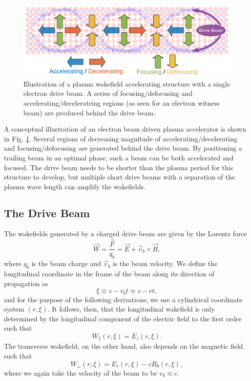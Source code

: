\begin{figure}[hbt]
    \centering
    \includegraphics[width=0.85\linewidth,trim={0mm 0mm 0mm 0mm},clip]{figures/PlasmaWakefield}
    \caption{\label{Fig:PWFA:Illust} Illustration of a plasma wakefield accelerating structure with a single electron drive beam. A series of focusing/defocusing and accelerating/deceleratring regions (as seen for an electron witness beam) are produced behind the drive beam.}
\end{figure}

A conceptual illustration of an electron beam driven plasma accelerator is shown in Fig. \ref{Fig:PWFA:Illust}. Several regions of decreasing magnitude of accelerating/decelerating and focusing/defocusing are generated behind the drive beam. By positioning a trailing beam in an optimal phase, such a beam can be both accelerated and focused. The drive beam needs to be shorter than the plasma period for this structure to develop, but multiple short drive beams with a separation of the plasma wave length can amplify the wakefields.

\subsection{The Drive Beam}
\label{Int:BPI:Drive}

The wakefields generated by a charged drive beam are given by the Lorentz force
\begin{equation}
    \vec{W} = \frac{\vec{F}}{q_{b}} = \vec{E} + \vec{v}_{b} \times \vec{B}, \label{EQ:Lorentz}
\end{equation}
where $q_{b}$ is the beam charge and $\vec{v}_{b}$ is the beam velocity. We define the longitudinal coordinate in the frame of the beam along its direction of propagation as
\begin{equation}
    \xi \equiv z - v_{b}t \approx z - ct, \label{EQ:Xi}
\end{equation}
and for the purpose of the following derivations, we use a cylindrical coordinate system $(r, \xi)$. It follows, then, that the longitudinal wakefield is only determined by the longitudinal component of the electric field \dash to the first order \dash such that
\begin{equation}
    W_{\parallel}(r,\xi) = E_{z}(r,\xi). \label{EQ:Wz}
\end{equation}
The transverse wakefield, on the other hand, also depends on the magnetic field such that
\begin{equation}
    W_{\perp}(r,\xi) = E_{r}(r,\xi) - cB_{\theta}(r,\xi), \label{EQ:Wr}
\end{equation}
where we again take the velocity of the beam to be $v_{b} \approx c$.

